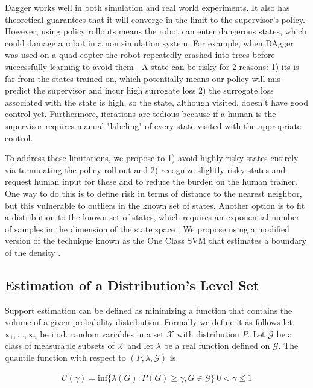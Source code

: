 \documentclass[10pt, conference]{ieeeconf}      %
\begin{document}
Dagger works well in both simulation and real world experiments. It also has theoretical guarantees that it will converge in the limit to the supervisor's policy. However, using policy rollouts means the robot can enter dangerous states, which could damage a robot in a non simulation system. For example, when DAgger was used on a quad-copter the robot repeatedly crashed into trees before successfully learning to avoid them \cite{ross2013learning}. A state can be risky for 2 reasons: 1) its is far from the states trained on, which potentially means our policy will mis-predict the supervisor and incur high surrogate loss \cite{tokdar2010importance} 2) the surrogate loss associated with the state is high, so the state, although visited, doesn't have good control yet. Furthermore, iterations are tedious because if a human is the supervisor requires manual "labeling" of every state visited with the appropriate control. 

To address these limitations, we propose to 1) avoid highly risky states entirely via terminating the policy roll-out and 2) recognize slightly risky states and request human input for these and to reduce the burden on the human trainer. One way to do this is to define risk in terms of distance to the nearest neighbor, but this vulnerable to outliers in the known set of states. Another option is to fit a distribution to the known set of states, which requires an exponential number of samples in the dimension of the state space \cite{nadaraya1964estimating}. We propose using a modified version of the technique known as the One Class SVM that  estimates a boundary of the density \cite{scholkopf2001estimating}.


\subsection{Estimation of a Distribution's Level Set}\label{sec:level}
Support estimation can be defined as minimizing a function that contains the volume of a given probability distribution. Formally we define it as follows let $\mathbf{x}_1,...,\mathbf{x}_n $ be i.i.d. random variables in a set $\mathcal{X}$ with distribution $P$. Let $\mathcal{G}$ be a class of measurable subsets of $\mathcal{X}$ and let $\lambda$ be a real function defined on $\mathcal{G}$. The quantile function with respect to $(P,\lambda,\mathcal{G})$ is 

\vspace{-2ex}
\begin{align}\label{eq:quantile}
U(\gamma) = \mbox{inf} \lbrace \lambda(G):P(G) \geq \gamma, G \in \mathcal{G} \rbrace \: 0<\gamma \leq 1
\end{align} 
\end{document}
